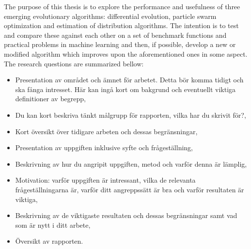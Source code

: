 The purpose of this thesis is to explore the performance and usefulness of three emerging evolutionary algorithms: differential evolution, particle swarm optimization and estimation of distribution algorithms. The intention is to test and compare these against each other on a set of benchmark functions and practical problems in machine learning and then, if possible, develop a new or modified algorithm which improves upon the aforementioned ones in some aspect. The research questions are summarized bellow:

{\color{blue}
\begin{itemize}
\item Presentation av omr\r{a}det och \"amnet f\"or arbetet. Detta b\"or komma tidigt och ska f\r{a}nga intresset. H\"ar kan ing\r{a} kort om bakgrund och eventuellt viktiga definitioner av begrepp,
\item	Du kan kort beskriva t\"ankt m\r{a}lgrupp f\"or rapporten, vilka har du skrivit f\"or?,
\item	Kort \"oversikt \"over tidigare arbeten och dessas begr\"ansningar,
\item	Presentation av uppgiften inklusive syfte och fr\r{a}gest\"allning,
\item	Beskrivning av hur du angripit uppgiften, metod och varf\"or denna \"ar l\"amplig,
\item	Motivation: varf\"or uppgiften \"ar intressant, vilka de relevanta fr\r{a}gest\"allningarna \"ar, varf\"or ditt angreppss\"att \"ar bra och varf\"or resultaten \"ar viktiga,
\item	Beskrivning av de viktigaste resultaten och dessas begr\"ansningar samt vad som \"ar nytt i ditt arbete,
\item	\"Oversikt av rapporten.
\end{itemize}
}
